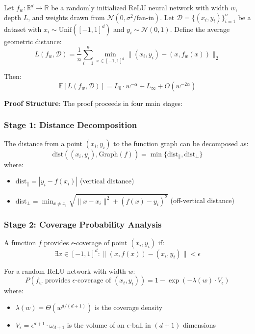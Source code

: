 \begin{theorem}
Let $f_w: \mathbb{R}^d \to \mathbb{R}$ be a randomly initialized ReLU neural network with width $w$, depth $L$, and weights drawn from $\mathcal{N}(0, \sigma^2/\text{fan-in})$. Let $\mathcal{D} = \{(x_i, y_i)\}_{i=1}^n$ be a dataset with $x_i \sim \text{Unif}([-1,1]^d)$ and $y_i \sim \mathcal{N}(0,1)$. Define the average geometric distance:
$$L(f_w, \mathcal{D}) = \frac{1}{n} \sum_{i=1}^n \min_{x \in [-1,1]^d} \|(x_i, y_i) - (x, f_w(x))\|_2$$

Then:
$$\mathbb{E}[L(f_w, \mathcal{D})] = L_0 \cdot w^{-\alpha} + L_\infty + O(w^{-2\alpha})$$
\end{theorem}

\textbf{Proof Structure}: The proof proceeds in four main stages:

\subsubsection{Stage 1: Distance Decomposition}

\begin{lemma}
The distance from a point $(x_i, y_i)$ to the function graph can be decomposed as:
$$\text{dist}((x_i, y_i), \text{Graph}(f)) = \min \{\text{dist}_\parallel, \text{dist}_\perp\}$$
where:
\begin{itemize}
    \item $\text{dist}_\parallel = |y_i - f(x_i)|$ (vertical distance)
    \item $\text{dist}_\perp = \min_{x \neq x_i} \sqrt{\|x - x_i\|^2 + (f(x) - y_i)^2}$ (off-vertical distance)
\end{itemize}
\end{lemma}

\subsubsection{Stage 2: Coverage Probability Analysis}

\begin{definition}
A function $f$ provides $\epsilon$-coverage of point $(x_i, y_i)$ if:
$$\exists x \in [-1,1]^d : \|(x, f(x)) - (x_i, y_i)\| < \epsilon$$
\end{definition}

\begin{lemma}
For a random ReLU network with width $w$:
$$P(f_w \text{ provides } \epsilon\text{-coverage of } (x_i, y_i)) = 1 - \exp\left(-\lambda(w) \cdot V_\epsilon\right)$$
where:
\begin{itemize}
    \item $\lambda(w) = \Theta(w^{d/(d+1)})$ is the coverage density
    \item $V_\epsilon = \epsilon^{d+1} \cdot \omega_{d+1}$ is the volume of an $\epsilon$-ball in $(d+1)$ dimensions
\end{itemize}
\end{lemma}

